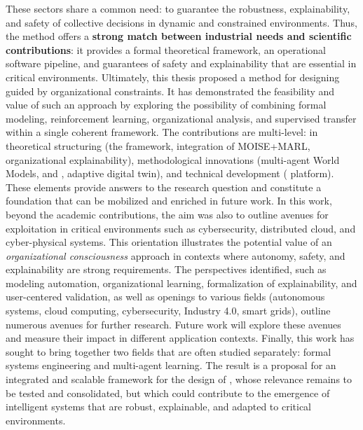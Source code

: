 These sectors share a common need: to guarantee the robustness, explainability, and safety of collective decisions in dynamic and constrained environments.
\medskip
\noindent
Thus, the  method offers a \textbf{strong match between industrial needs and scientific contributions}:
it provides a formal theoretical framework, an operational software pipeline, and guarantees of safety and explainability that are essential in critical environments.
\medskip
\noindent
Ultimately, this thesis proposed a method for designing  guided by organizational constraints.
It has demonstrated the feasibility and value of such an approach by exploring the possibility of combining formal modeling, reinforcement learning, organizational analysis, and supervised transfer within a single coherent framework.
\medskip
\noindent
The contributions are multi-level: in theoretical structuring (the  framework, integration of MOISE+MARL, organizational explainability), methodological innovations (multi-agent World Models,  and , adaptive digital twin), and technical development ( platform).
These elements provide answers to the research question and constitute a foundation that can be mobilized and enriched in future work.
\medskip
\noindent
In this work, beyond the academic contributions, the aim was also to outline avenues for exploitation in critical environments such as cybersecurity, distributed cloud, and cyber-physical systems.
This orientation illustrates the potential value of an \textit{organizational consciousness} approach in contexts where autonomy, safety, and explainability are strong requirements.
\medskip
\noindent
The perspectives identified, such as modeling automation, organizational learning, formalization of explainability, and user-centered validation, as well as openings to various fields (autonomous systems, cloud computing, cybersecurity, Industry 4.0, smart grids), outline numerous avenues for further research.
Future work will explore these avenues and measure their impact in different application contexts.
\medskip
\noindent
Finally, this work has sought to bring together two fields that are often studied separately: formal systems engineering and multi-agent learning.
The result is a proposal for an integrated and scalable framework for the design of , whose relevance remains to be tested and consolidated, but which could contribute to the emergence of intelligent systems that are robust, explainable, and adapted to critical environments.

\clearpage
\thispagestyle{empty}
\null
\newpage
